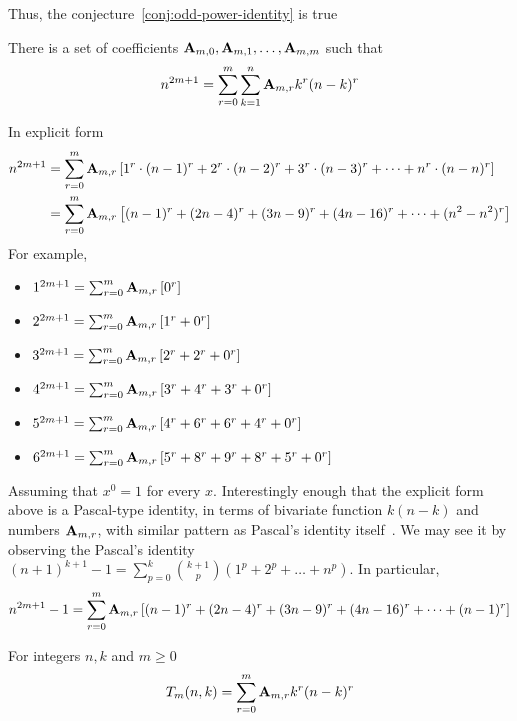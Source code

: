 Thus, the conjecture~\eqref{conj:odd-power-identity} is true

\begin{theorem}
    \label{theorem:odd-power-identity}
    There is a set of coefficients ${\mathbf{A}} \sb{m,0}, {\mathbf{A}} \sb{m,1}, \ldots, {\mathbf{A}} \sb{m,m}$ such that
    \begin{align*}
        n^{2m+1} = \sum_{r=0}^{m} \sum_{k=1}^{n} {\mathbf{A}} \sb{m,r} k^r (n-k)^r
    \end{align*}
\end{theorem}
In explicit form
\begin{align*}
    n^{2m+1} &= \sum_{r=0}^{m} {\mathbf{A}} \sb{m,r} \left[ 1^r \cdot (n-1)^r + 2^r \cdot (n-2)^r + 3^r \cdot (n-3)^r + \cdots + n^r \cdot (n-n)^r  \right] \\
    &= \sum_{r=0}^{m} {\mathbf{A}} \sb{m,r} \left[ (n-1)^r + (2n-4)^r + (3n-9)^r + (4n-16)^r + \cdots +  (n^2-n^2)^r  \right]
\end{align*}
For example,
\begin{itemize}
    \item $1^{2m+1} = \sum_{r=0}^{m} {\mathbf{A}} \sb{m,r} \left[ 0^r  \right]$
    \item $2^{2m+1} = \sum_{r=0}^{m} {\mathbf{A}} \sb{m,r} \left[ 1^r + 0^r  \right]$
    \item $3^{2m+1} = \sum_{r=0}^{m} {\mathbf{A}} \sb{m,r} \left[ 2^r + 2^r + 0^r  \right]$
    \item $4^{2m+1} = \sum_{r=0}^{m} {\mathbf{A}} \sb{m,r} \left[ 3^r + 4^r + 3^r + 0^r  \right]$
    \item $5^{2m+1} = \sum_{r=0}^{m} {\mathbf{A}} \sb{m,r} \left[ 4^r + 6^r + 6^r + 4^r + 0^r  \right]$
    \item $6^{2m+1} = \sum_{r=0}^{m} {\mathbf{A}} \sb{m,r} \left[ 5^r + 8^r + 9^r + 8^r + 5^r + 0^r  \right]$
\end{itemize}
Assuming that $x^0=1$ for every $x$.
Interestingly enough that the explicit form above is a Pascal-type identity,
in terms of bivariate function $k(n-k)$ and numbers ${\mathbf{A}} \sb{m,r}$,
with similar pattern as Pascal's identity itself~\cite{macmillan2011proofs}.
We may see it by observing the Pascal's identity $(n+1)^{k+1}-1=\sum _{p=0}^{k}{\binom {k+1}{p}}(1^{p}+2^{p}+\dots +n^{p})$.
In particular,
\begin{align*}
    n^{2m+1} - 1
    = \sum_{r=0}^{m} {\mathbf{A}} \sb{m,r} \left[ (n-1)^r + (2n-4)^r + (3n-9)^r + (4n-16)^r + \cdots +  (n-1)^r  \right]
\end{align*}
\begin{definition}
    For integers $n,k$ and $m \geq 0$
    \label{def:bivariate-sum-Tm}
    \begin{align*}
        T_{m}(n,k) = \sum_{r=0}^{m} {\mathbf{A}} \sb{m,r} k^r (n-k)^r
    \end{align*}
\end{definition}

